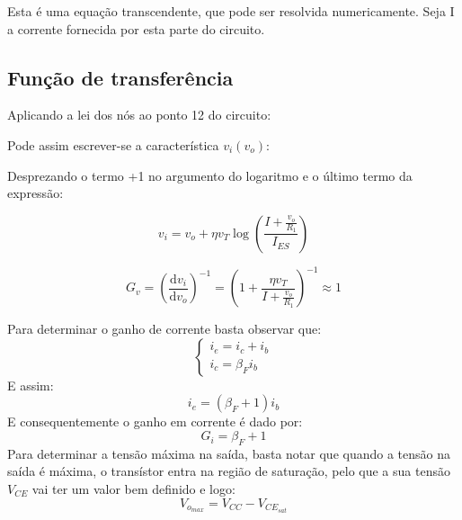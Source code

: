\documentclass[%
  reprint,
  nofootinbib,
  amsmath,amssymb,
  aps,
  10pt,
  a4paper
]{revtex4-1}
\begin{document}
Esta é uma equação transcendente, que pode ser resolvida numericamente. Seja I a corrente fornecida por esta parte do circuito.

\subsection{Função de transferência}

Aplicando a lei dos nós ao ponto 12 do circuito:



Pode assim escrever-se a característica $v_i(v_o)$:


Desprezando o termo +1 no argumento do logaritmo e o último termo da expressão:

\begin{equation}
v_i=v_o+\eta v_T\log \left(\frac{I+\frac{v_o}{R_1}}{I_{ES}}\right)
\end{equation}

\begin{equation}
G_v=\left(\frac{\mathrm{d}v_i}{\mathrm{d}v_o}\right)^{-1}=\left(1+\frac{\eta v_T}{I+\frac{v_o}{R_1}}\right)^{-1}\approx 1
\label{eq:g_v}
\end{equation}

Para determinar o ganho de corrente basta observar que:
\begin{equation}
\begin{cases} i_e=i_c+i_b\\ i_c=\beta_F i_b
\end{cases}
\end{equation}
E assim:
\begin{equation}
i_e=(\beta_F+1)i_b
\end{equation}
E consequentemente o ganho em corrente é dado por:
\begin{equation}
G_i=\beta_F+1
\label{eq:g_i}
\end{equation}
Para determinar a tensão máxima na saída, basta notar que quando a tensão na saída é máxima, o transístor entra na região de saturação, pelo que a sua tensão $V_{CE}$ vai ter um valor bem definido e logo:
\begin{equation}
V_{o_{max}}=V_{CC}-V_{{CE}_{sat}}
\label{eq:sat}
\end{equation}
\end{document}
